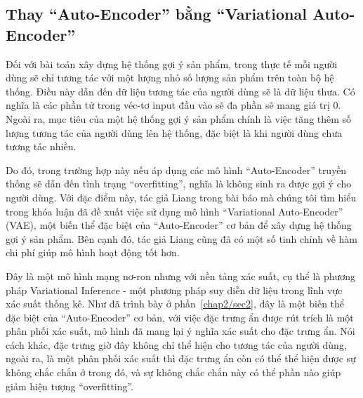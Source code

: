     \subsection{Thay ``Auto-Encoder'' bằng ``Variational Auto-Encoder''}
    Đối với bài toán xây dựng hệ thống gợi ý sản phẩm, trong thực tế mỗi người dùng sẽ chỉ tương tác với một lượng nhỏ số lượng sản phẩm trên toàn bộ hệ thống.
    Điều này dẫn đến dữ liệu tương tác của người dùng sẽ là dữ liệu thưa.    
    Có nghĩa là các phần tử trong véc-tơ input đầu vào sẽ đa phần sẽ mang giá trị 0. 
    Ngoài ra, mục tiêu của một hệ thống gợi ý sản phẩm chính là việc tăng thêm số lượng tương tác của người dùng lên hệ thống, đặc biệt là khi người dùng chưa tương tác nhiều.

    Do đó, trong trường hợp này nếu áp dụng các mô hình ``Auto-Encoder'' truyền thống sẽ dẫn đến tình trạng ``overfitting'', nghĩa là không sinh ra được gợi ý cho người dùng.
    Với đặc điểm này, tác giả Liang trong bài báo \cite{mvae} mà chúng tôi tìm hiểu trong khóa luận đã đề xuất việc sử dụng mô hình ``Variational Auto-Encoder'' (VAE), một biến thể đặc biệt của ``Auto-Encoder'' cơ bản để xây dựng hệ thống gợi ý sản phẩm. 
    Bên cạnh đó, tác giả Liang cũng đã có một số tinh chỉnh về hàm chi phí giúp mô hình hoạt động tốt hơn.
    
    Đây là một mô hình mạng nơ-ron nhưng với nền tảng xác suất, cụ thể là phương pháp Variational Inference - một phương pháp suy diễn dữ liệu trong lĩnh vực xác suất thống kê.
    Như đã trình bày ở phần~\ref{chap2/sec2}, đây là một biến thể đặc biệt của ``Auto-Encoder'' cơ bản, với việc đặc trưng ẩn được rút trích là một phân phối xác suất, mô hình đã mang lại ý nghĩa xác suất cho đặc trưng ẩn.
    Nói cách khác, đặc trưng giờ đây không chỉ thể hiện cho tương tác của người dùng, ngoài ra, là một phân phối xác suất thì đặc trưng ẩn còn có thể thể hiện được sự không chắc chắn ở trong đó, và sự không chắc chắn này có thể phần nào giúp giảm hiện tượng ``overfitting''.


